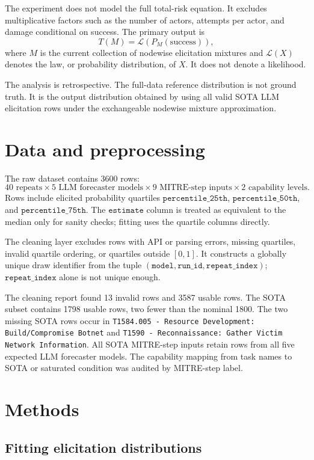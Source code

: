 \documentclass[11pt]{article}
\newcommand{\law}{\mathcal{L}}
\begin{document}
The experiment does not model the full total-risk equation. It excludes multiplicative factors such as the number of actors, attempts per actor, and damage conditional on success. The primary output is
\[
T(M)=\law\left(P_M(\mathrm{success})\right),
\]
where \(M\) is the current collection of nodewise elicitation mixtures and \(\law(X)\) denotes the law, or probability distribution, of \(X\). It does not denote a likelihood.

The analysis is retrospective. The full-data reference distribution is not ground truth. It is the output distribution obtained by using all valid SOTA LLM elicitation rows under the exchangeable nodewise mixture approximation.

\section{Data and preprocessing}

The raw dataset contains 3600 rows:
\[
40 \text{ repeats} \times 5 \text{ LLM forecaster models} \times 9 \text{ MITRE-step inputs} \times 2 \text{ capability levels}.
\]
Rows include elicited probability quartiles \(\texttt{percentile\_25th}\), \(\texttt{percentile\_50th}\), and \(\texttt{percentile\_75th}\). The \(\texttt{estimate}\) column is treated as equivalent to the median only for sanity checks; fitting uses the quartile columns directly.

The cleaning layer excludes rows with API or parsing errors, missing quartiles, invalid quartile ordering, or quartiles outside \([0,1]\). It constructs a globally unique draw identifier from the tuple \((\texttt{model}, \texttt{run\_id}, \texttt{repeat\_index})\); \(\texttt{repeat\_index}\) alone is not unique enough.

The cleaning report found 13 invalid rows and 3587 usable rows. The SOTA subset contains 1798 usable rows, two fewer than the nominal 1800. The two missing SOTA rows occur in \texttt{T1584.005 - Resource Development: Build/Compromise Botnet} and \texttt{T1590 - Reconnaissance: Gather Victim Network Information}. All SOTA MITRE-step inputs retain rows from all five expected LLM forecaster models. The capability mapping from task names to SOTA or saturated condition was audited by MITRE-step label.

\section{Methods}

\subsection{Fitting elicitation distributions}
\end{document}

